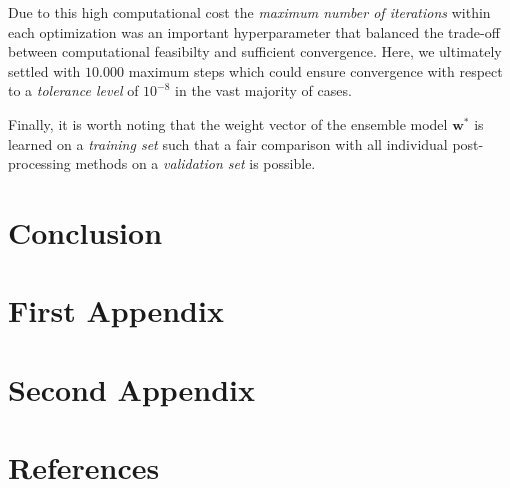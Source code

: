 \documentclass[
]{article}
\begin{document}
Due to this high computational cost the \emph{maximum number of iterations} within each optimization was an important hyperparameter that balanced the trade-off between computational feasibilty and sufficient convergence.
Here, we ultimately settled with \(10.000\) maximum steps which could ensure convergence with respect to a \emph{tolerance level} of \(10^{-8}\) in the vast majority of cases.

Finally, it is worth noting that the weight vector of the ensemble model \(\mathbf{w}^*\) is learned on a \emph{training set} such that a fair comparison with all individual post-processing methods on a \emph{validation set} is possible.

\newpage

\hypertarget{conclusion}{%
\section{Conclusion}\label{conclusion}}

\newpage

\hypertarget{appendix-appendix}{%
\appendix}


\hypertarget{first-appendix}{%
\section{First Appendix}\label{first-appendix}}

\hypertarget{second-appendix}{%
\section{Second Appendix}\label{second-appendix}}

\newpage

\hypertarget{references}{%
\section*{References}\label{references}}
\end{document}
